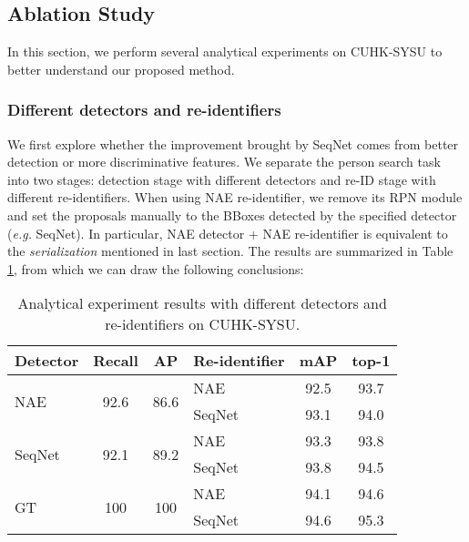 \documentclass[letterpaper]{article} \usepackage{aaai21}  \usepackage{times}  \usepackage{helvet} \usepackage{courier}  \usepackage[hyphens]{url}  \usepackage{graphicx} \urlstyle{rm} \def\UrlFont{\rm}  \usepackage{natbib}  \usepackage{caption} \usepackage{multirow}
\begin{document}
\subsection{Ablation Study}
In this section, we perform several analytical experiments on CUHK-SYSU to better understand our proposed method.

\subsubsection{Different detectors and re-identifiers}
We first explore whether the improvement brought by SeqNet comes from better detection or more discriminative features. We separate the person search task into two stages: detection stage with different detectors and re-ID stage with different re-identifiers. When using NAE re-identifier, we remove its RPN module and set the proposals manually to the BBoxes detected by the specified detector (\textit{e.g.} SeqNet). In particular, NAE detector + NAE re-identifier is equivalent to the \textit{serialization} mentioned in last section. The results are summarized in Table \ref{diff_detectors_identifiers}, from which we can draw the following conclusions:

\begin{table}[t]
    \centering
\resizebox{0.8\columnwidth}{!}
    {
        \begin{tabular}{|l|cc|l|cc|}
            \hline
            \textbf{Detector}       & \textbf{Recall}       & \textbf{AP}           & \textbf{Re-identifier} & \textbf{mAP} & \textbf{top-1} \\ \hline \hline
\multirow{2}{*}{NAE}    & \multirow{2}{*}{92.6} & \multirow{2}{*}{86.6} & NAE                     & 92.5         & 93.7           \\
                                    &                       &                       & SeqNet                  & 93.1         & 94.0           \\ \hline
            \multirow{2}{*}{SeqNet} & \multirow{2}{*}{92.1} & \multirow{2}{*}{89.2} & NAE                     & 93.3         & 93.8           \\
                                    &                       &                       & SeqNet                  & 93.8         & 94.5           \\ \hline
            \multirow{2}{*}{GT}     & \multirow{2}{*}{100}  & \multirow{2}{*}{100}  & NAE                     & 94.1         & 94.6           \\
                                    &                       &                       & SeqNet                  & 94.6         & 95.3           \\ \hline
        \end{tabular}
    }
    \caption{Analytical experiment results with different detectors and re-identifiers on CUHK-SYSU.}
    \label{diff_detectors_identifiers}
\end{table}
\end{document}
